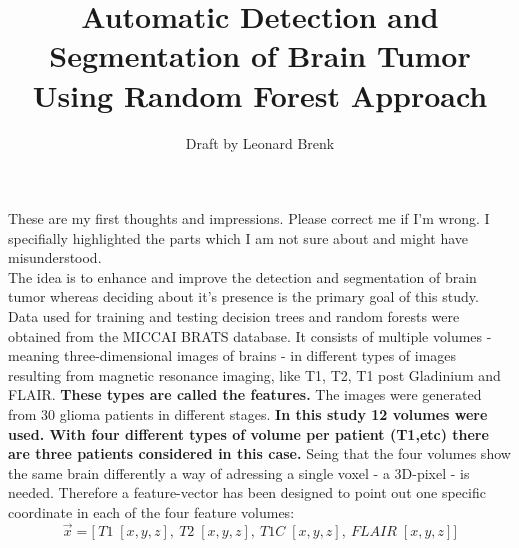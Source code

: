 \documentclass{article}
\title{Automatic Detection and Segmentation of Brain Tumor Using Random Forest Approach}
\author{Draft by Leonard Brenk}
\begin{document}
    \maketitle


    These are my first thoughts and impressions. Please correct me if I'm wrong. I specifially highlighted the parts which I am not sure about and might have misunderstood.\\

    The idea is to enhance and improve the detection and segmentation of brain tumor whereas deciding about it's presence is the primary goal of this study. Data used for training and testing decision trees and random forests were obtained from the MICCAI BRATS database. It consists of multiple volumes - meaning three-dimensional images of brains - in different types of images resulting from magnetic resonance imaging, like T1, T2, T1 post Gladinium and FLAIR. \textbf{These types are called the features.} The images were generated from 30 glioma patients in different stages. \textbf{In this study 12 volumes were used. With four different types of volume per patient (T1,etc) there are three patients considered in this case.} Seing that the four volumes show the same brain differently a way of adressing a single voxel - a 3D-pixel - is needed. Therefore a feature-vector has been designed to point out one specific coordinate in each of the four feature volumes: \\

    \[ \vec{x} = \bigg[ \: T1\; [x,y,z], \: T2\; [x,y,z], \: T1C\; [x,y,z],\:  FLAIR\; [x,y,z] \bigg] \]\\
\end{document}
